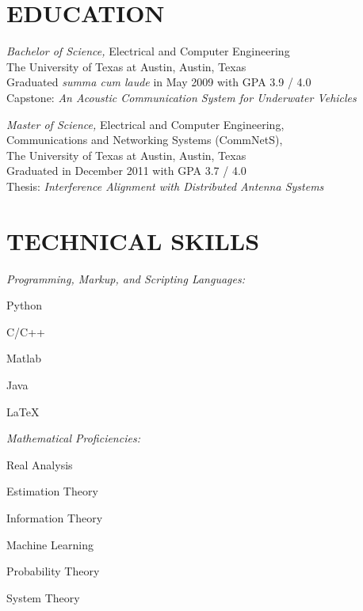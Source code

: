 \documentclass[line,margin=1in]{res}
\begin{document}
\address{40 N IH35 APT 10D2, Austin, Texas 78701}
\address{(512) 237-7562 \\ \url{jonstarr@utexas.edu}}
 
\begin{resume}

\section{EDUCATION} 
{\sl Bachelor of Science,} Electrical and Computer Engineering \\
  The University of Texas at Austin, Austin, Texas \\
  Graduated \textit{summa cum laude} in May 2009 with GPA 3.9 / 4.0 \\
  Capstone: \textit{An Acoustic Communication System for Underwater Vehicles}~\cite{starr2009acoustic}

{\sl Master of Science,} Electrical and Computer Engineering, \\
  Communications and Networking Systems (CommNetS), \\
  The University of Texas at Austin, Austin, Texas \\
  Graduated in December 2011 with GPA 3.7 / 4.0 \\
  Thesis: \textit{Interference Alignment with Distributed Antenna Systems}~\cite{starr2011thesis}

\section{TECHNICAL SKILLS} 
  {\sl Programming, Markup, and Scripting Languages:}
  \vspace*{-0.75\baselineskip}
  \begin{multicols}{6}
    \begin{compactitem}
      \item{Python}
      \item{C/C++}
      \item{Matlab}
      \item{Java}
      \item{\LaTeX}
    \end{compactitem}
  \end{multicols}

  \vspace*{-1.5\baselineskip}

  {\sl Mathematical Proficiencies:}
  \vspace*{-0.75\baselineskip}
  \begin{multicols}{3}
    \begin{compactitem}
      \item{Real Analysis}
      \item{Estimation Theory}
      \item{Information Theory}
      \item{Machine Learning}
      \item{Probability Theory}
      \item{System Theory}
    \end{compactitem}
  \end{multicols}


\end{resume}
\end{document}
